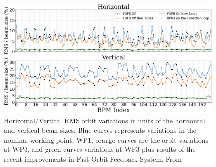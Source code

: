 \begin{figure}[htb]
    \centering
    \includegraphics[width=\textwidth]{Images/WEOGA2_f5.png}
    \caption{Horizontal/Vertical RMS orbit variations in units of the horizontal and vertical beam sizes. Blue curves represents variations in the nominal working point, WP1, orange curves are the orbit variations at WP3, and green curves variations at WP3 plus results of the recent improvements in Fast Orbit Feedback System. From~\cite{Liu:IPAC23-WEOGA2}}
\end{figure}

